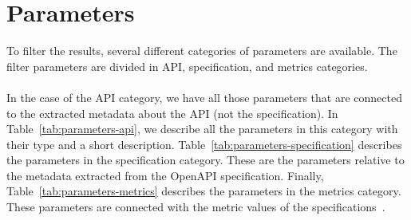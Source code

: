 \section{Parameters}\label{sec:parameters}
To filter the results, several different categories of parameters are available.
The filter parameters are divided in API, specification, and metrics categories. \\ \\
In the case of the API category, we have all those parameters that are connected to the extracted metadata about the API (not the specification).
In Table~\ref{tab:parameters-api}, we describe all the parameters in this category with their type and a short description.
Table~\ref{tab:parameters-specification} describes the parameters in the specification category.
These are the parameters relative to the metadata extracted from the OpenAPI specification.
Finally, Table~\ref{tab:parameters-metrics} describes the parameters in the metrics category.
These parameters are connected with the metric values of the specifications~\cite{souhaila_serbout_apistic_2024}.

